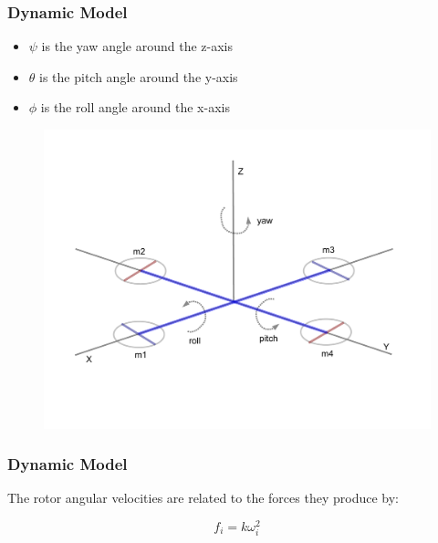 \documentclass{beamer}
\begin{document}
\begin{frame}
\frametitle{Dynamic Model}


\begin{itemize}
	\item $\psi$ is the yaw angle around the z-axis
	\item $\theta$ is the pitch angle around the y-axis
	\item $\phi$ is the roll angle around the x-axis
\end{itemize}

\begin{figure}
\includegraphics[width=0.8\linewidth]{coords.pdf}
\end{figure}

\end{frame}



\begin{frame}
\frametitle{Dynamic Model}

The rotor angular velocities are related to the forces they produce by:

\begin{equation} 
	f_i = k \omega^2_i
\end{equation}


\end{frame}


\end{document}
